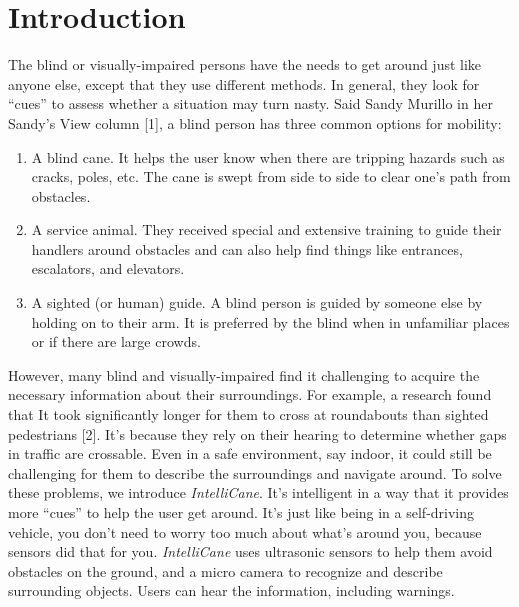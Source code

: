 \section{Introduction}
The blind or visually-impaired persons have the needs to get around just like anyone else, except that they use different methods. In general, they look for “cues” to assess whether a situation may turn nasty. Said Sandy Murillo in her Sandy’s View column [1], a blind person has three common options for mobility:

\begin{enumerate}
  \item A blind cane. It helps the user know when there are tripping hazards such as cracks, poles, etc. The cane is swept from side to side to clear one’s path from obstacles.
  \item A service animal. They received special and extensive training to guide their handlers around obstacles and can also help find things like entrances, escalators, and elevators.
  \item A sighted (or human) guide. A blind person is guided by someone else by holding on to their arm. It is preferred by the blind when in unfamiliar places or if there are large crowds.
\end{enumerate}

However, many blind and visually-impaired find it challenging to acquire the necessary information about their surroundings. For example, a research found that It took significantly longer for them to cross at roundabouts than sighted pedestrians [2]. It’s because they rely on their hearing to determine whether gaps in traffic are crossable.
\newline\newline
Even in a safe environment, say indoor, it could still be challenging for them to describe the surroundings and navigate around.
\newline\newline
To solve these problems, we introduce \textit{IntelliCane}. It’s intelligent in a way that it provides more “cues” to help the user get around. It’s just like being in a self-driving vehicle, you don’t need to worry too much about what’s around you, because sensors did that for you.
\newline\newline
\textit{IntelliCane} uses ultrasonic sensors to help them avoid obstacles on the ground, and a micro camera to recognize and describe surrounding objects. Users can hear the information, including warnings.

